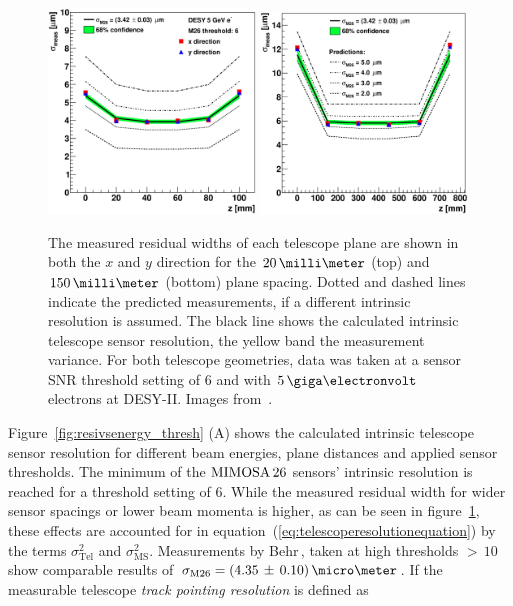 \begin{figure}[tbp]
  \centering
  \includegraphics[width=0.49\textwidth]{figures/20} %
  \includegraphics[width=0.49\textwidth]{figures/150} %
  \caption[The measured residual widths of each telescope plane.]{The measured residual widths of each telescope plane are shown in both the $x$ and $y$ direction for the $20\,\milli\meter$ (top)
   and $150\,\milli\meter$ (bottom) plane spacing.
  Dotted and dashed lines indicate the predicted measurements, if a different intrinsic resolution is assumed.
  The black line shows the calculated intrinsic telescope sensor resolution, the yellow band the measurement variance.
  For both telescope geometries, data was taken at a sensor SNR threshold setting of $6$ and with $5\,\giga\electronvolt$ electrons at DESY-II.
  Images from~\cite{ref:thomas}.}
  \label{fig:smiley}
\end{figure}

Figure~\ref{fig:resivsenergy_thresh} (A) shows the calculated intrinsic telescope sensor resolution for different beam energies, plane distances and applied sensor thresholds.
The minimum of the $\textrm{MIMOSA\,26}$ sensors' intrinsic resolution is reached for a threshold setting of $6$.
While the measured residual width for wider sensor spacings or lower beam momenta is higher, as can be seen in figure~\ref{fig:smiley},
 these effects are accounted for in equation~(\ref{eq:telescoperesolutionequation}) by the terms $\sigma_{\textrm{Tel}}^2$ and $\sigma_{\textrm{MS}}^2$.
Measurements by Behr\,\cite{ref:j.behrmeasurements}, taken at high thresholds $>\,10$ show comparable results of $\sigma_{\textrm{M26}} = (4.35\,\pm\,0.10)\,\micro\meter$.
If the measurable telescope \textit{track pointing resolution} is defined as

